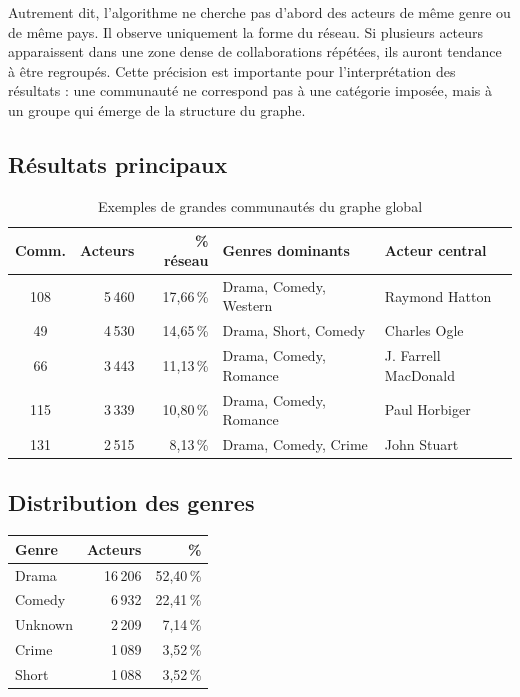 \documentclass[a4paper,12pt]{article}
\begin{document}
Autrement dit, l'algorithme ne cherche pas d'abord des acteurs de même genre ou de même pays. Il observe uniquement la forme du réseau. Si plusieurs acteurs apparaissent dans une zone dense de collaborations répétées, ils auront tendance à être regroupés. Cette précision est importante pour l'interprétation des résultats : une communauté ne correspond pas à une catégorie imposée, mais à un groupe qui émerge de la structure du graphe.

\subsection{Résultats principaux}

\begin{table}[H]
\centering
\small
\begin{tabular}{crrll}
\toprule
\rowcolor{imdblight}
\textbf{Comm.} & \textbf{Acteurs} & \textbf{\% réseau} & \textbf{Genres dominants} & \textbf{Acteur central} \\
\midrule
108 & 5\,460 & 17,66\,\% & Drama, Comedy, Western & Raymond Hatton \\
49  & 4\,530 & 14,65\,\% & Drama, Short, Comedy   & Charles Ogle \\
66  & 3\,443 & 11,13\,\% & Drama, Comedy, Romance & J. Farrell MacDonald \\
115 & 3\,339 & 10,80\,\% & Drama, Comedy, Romance & Paul Horbiger \\
131 & 2\,515 &  8,13\,\% & Drama, Comedy, Crime   & John Stuart \\
\bottomrule
\end{tabular}
\caption{Exemples de grandes communautés du graphe global}
\end{table}

\subsection{Distribution des genres}

\begin{center}
\begin{tabular}{lrr}
\toprule
\rowcolor{imdblight}
\textbf{Genre} & \textbf{Acteurs} & \textbf{\%} \\
\midrule
Drama   & 16\,206 & 52,40\,\% \\
Comedy  &  6\,932 & 22,41\,\% \\
Unknown &  2\,209 &  7,14\,\% \\
Crime   &  1\,089 &  3,52\,\% \\
Short   &  1\,088 &  3,52\,\% \\
\bottomrule
\end{tabular}
\end{center}
\end{document}
